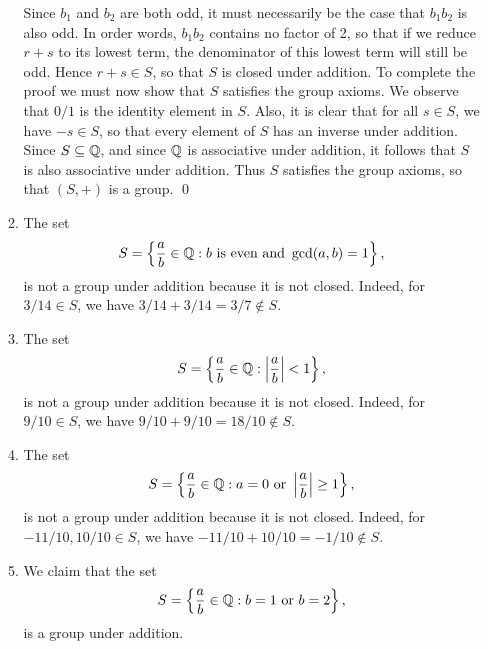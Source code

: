 \begin{enumerate}
\begin{enumerate}
               Since $b_1$ and $b_2$ are both odd, it must necessarily be the 
               case that $b_1b_2$ is also odd. In order words, $b_1b_2$ contains 
               no factor of 2, so that if we reduce $r + s$ to its lowest term, 
               the denominator of this lowest term will still be odd. Hence
               $r + s \in S$, so that $S$ is closed under addition. To complete 
               the proof we must now show that $S$ satisfies the group axioms. 
               We observe that $0/1$ is the identity element in $S$. Also, it is 
               clear that for all $s \in S$, we have $-s \in S$, so that every 
               element of $S$ has an inverse under addition. Since
               $S \subseteq \mathbb{Q}$, and since $\mathbb{Q}$ is associative under addition, 
               it follows that $S$ is also associative under addition. Thus $S$ 
               satisfies the group axioms, so that $(S, +)$ is a group. \qed
         \item The set
               $$S = \left\{\frac{a}{b} \in \mathbb{Q} : b \text{ is even} \text{ and }
                 \gcd(a, b) = 1\right\},$$
               is not a group under addition because it is not closed. Indeed,
               for $3/14 \in S$, we have $3/14 + 3/14 = 3/7 \notin S$.
         \item The set
               $$S = \left\{\frac{a}{b} \in \mathbb{Q} :
                     \left|\frac{a}{b}\right| < 1\right\},$$
               is not a group under addition because it is not closed. Indeed,
               for $9/10 \in S$, we have $9/10 + 9/10 = 18/10 \notin S$.
         \item The set
               $$S = \left\{\frac{a}{b} \in \mathbb{Q} : a = 0 \text{ or }
                     \left|\frac{a}{b}\right| \ge 1\right\},$$
               is not a group under addition because it is not closed. Indeed,
               for $-11/10, 10/10 \in S$, we have
               $-11/10 + 10/10 = -1/10 \notin S$.
         \item We claim that the set
               $$S = \left\{\frac{a}{b} \in \mathbb{Q} : b = 1 \text{ or }
                 b = 2\right\},$$
               is a group under addition.


\end{enumerate}
\end{enumerate}
